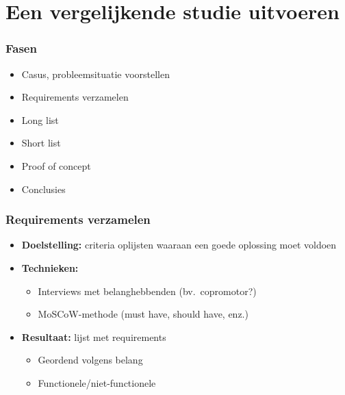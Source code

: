 \documentclass[aspectratio=169]{beamer}
\begin{document}
\section{Een vergelijkende studie uitvoeren}

\begin{frame}
  \frametitle{Fasen}


  \begin{itemize}
    \item Casus, probleemsituatie voorstellen
    \item Requirements verzamelen
    \item Long list
    \item Short list
    \item Proof of concept
    \item Conclusies
  \end{itemize}

\end{frame}

\begin{frame}
  \frametitle{Requirements verzamelen}

  \begin{itemize}
    \item \textbf{Doelstelling:} criteria oplijsten waaraan een goede oplossing moet voldoen
    \item \textbf{Technieken:}
          \begin{itemize}
            \item Interviews met belanghebbenden (bv.\ copromotor?)
            \item MoSCoW-methode (must have, should have, enz.)
          \end{itemize}
    \item \textbf{Resultaat:} lijst met requirements
          \begin{itemize}
            \item Geordend volgens belang
            \item Functionele/niet-functionele
          \end{itemize}
  \end{itemize}

\end{frame}
\end{document}
